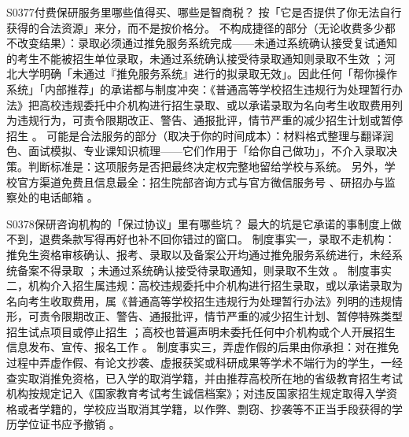 \begin{qa}{S0377}{付费保研服务里哪些值得买、哪些是智商税？}
按「它是否提供了你无法自行获得的合法资源」来分，而不是按价格分。
不构成捷径的部分（无论收费多少都不改变结果）：录取必须通过推免服务系统完成——未通过系统确认接受复试通知的考生不能被招生单位录取，未通过系统确认接受待录取通知则录取不生效 ；河北大学明确「未通过『推免服务系统』进行的拟录取无效」。因此任何「帮你操作系统」「内部推荐」的承诺都与制度冲突：《普通高等学校招生违规行为处理暂行办法》把高校违规委托中介机构进行招生录取、或以承诺录取为名向考生收取费用列为违规行为，可责令限期改正、警告、通报批评，情节严重的减少招生计划或暂停招生 。
可能是合法服务的部分（取决于你的时间成本）：材料格式整理与翻译润色、面试模拟、专业课知识梳理——它们作用于「给你自己做功」，不介入录取决策。判断标准是：这项服务是否把最终决定权完整地留给学校与系统。
另外，学校官方渠道免费且信息最全：招生院部咨询方式与官方微信服务号 、研招办与监察处的电话邮箱 。
\end{qa}

\begin{qa}{S0378}{保研咨询机构的「保过协议」里有哪些坑？}
最大的坑是它承诺的事制度上做不到，退费条款写得再好也补不回你错过的窗口。
制度事实一，录取不走机构：推免生资格审核确认、报考、录取以及备案公开均通过推免服务系统进行，未经系统备案不得录取 ；未通过系统确认接受待录取通知，则录取不生效 。
制度事实二，机构介入招生属违规：高校违规委托中介机构进行招生录取，或以承诺录取为名向考生收取费用，属《普通高等学校招生违规行为处理暂行办法》列明的违规情形，可责令限期改正、警告、通报批评，情节严重的减少招生计划、暂停特殊类型招生试点项目或停止招生 ；高校也普遍声明未委托任何中介机构或个人开展招生信息发布、宣传、报名工作 。
制度事实三，弄虚作假的后果由你承担：对在推免过程中弄虚作假、有论文抄袭、虚报获奖或科研成果等学术不端行为的学生，一经查实取消推免资格，已入学的取消学籍，并由推荐高校所在地的省级教育招生考试机构按规定记入《国家教育考试考生诚信档案》；对违反国家招生规定取得入学资格或者学籍的，学校应当取消其学籍，以作弊、剽窃、抄袭等不正当手段获得的学历学位证书应予撤销 。
\end{qa}

